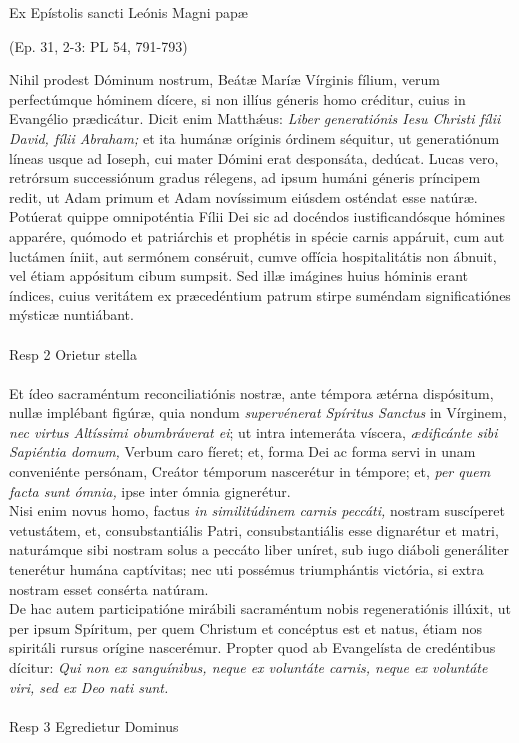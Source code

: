 \documentclass[options]{article}
\begin{document}
	Ex Epístolis sancti Leónis Magni papæ
	\begin{flushright}
		(Ep. 31, 2-3: PL 54, 791-793)	
	\end{flushright}
	Nihil prodest Dóminum nostrum, Beátæ Maríæ Vírginis fílium, verum perfectúmque hóminem dícere, si non illíus géneris homo créditur, cuius in Evangélio prædicátur.
	Dicit enim Matth\'{æ}us: \emph{Liber generatiónis Iesu Christi fílii David, fílii Abraham;} et ita humánæ oríginis órdinem séquitur, ut generatiónum líneas usque ad Ioseph, cui mater Dómini erat desponsáta, dedúcat.
	Lucas vero, retrórsum successiónum gradus rélegens, ad ipsum humáni géneris príncipem redit, ut Adam primum et Adam novíssimum eiúsdem osténdat esse natúræ.
	Potúerat quippe omnipoténtia Fílii Dei sic ad docéndos iustificandósque hómines apparére, quómodo et patriárchis et prophétis in spécie carnis appáruit, cum aut luctámen íniit, aut sermónem conséruit, cumve offícia hospitalitátis non ábnuit, vel étiam appósitum cibum sumpsit.
	Sed illæ imágines huius hóminis erant índices, cuius veritátem ex præcedéntium patrum stirpe suméndam significatiónes mýsticæ nuntiábant.\\
	\\
	Resp 2 Orietur stella\\
	\\
	Et ídeo sacraméntum reconciliatiónis nostræ, ante témpora ætérna dispósitum, nullæ implébant figúræ, quia nondum \emph{supervénerat Spíritus Sanctus} in Vírginem, \emph{nec virtus Altíssimi obumbráverat ei}; ut intra intemeráta víscera, \emph{ædificánte sibi Sapiéntia domum,} Verbum caro fíeret; et, forma Dei ac forma servi in unam conveniénte persónam, Creátor témporum nascerétur in témpore; et, \emph{per quem facta sunt ómnia,} ipse inter ómnia gignerétur.\\
	Nisi enim novus homo, factus \emph{in similitúdinem carnis peccáti,} nostram suscíperet vetustátem, et, consubstantiális Patri, consubstantiális esse dignarétur et matri, naturámque sibi nostram solus a peccáto liber uníret, sub iugo diáboli generáliter tenerétur humána captívitas; nec uti possémus triumphántis victória, si extra nostram esset consérta natúram.\\
	De hac autem participatióne mirábili sacraméntum nobis regeneratiónis illúxit, ut per ipsum Spíritum, per quem Christum et concéptus est et natus, étiam nos spiritáli rursus orígine nascerémur.
	Propter quod ab Evangelísta de credéntibus dícitur: \emph{Qui non ex sanguínibus, neque ex voluntáte carnis, neque ex voluntáte viri, sed ex Deo nati sunt.}\\
	\\
	Resp 3   Egredietur Dominus\\
	\\
\end{document}

